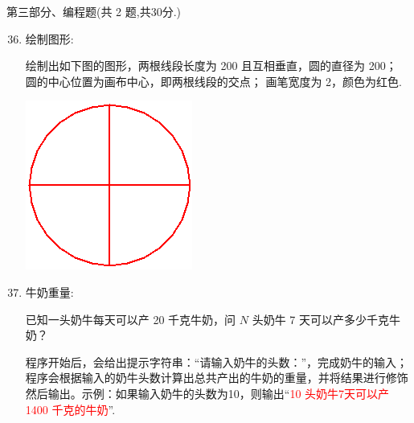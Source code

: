 \documentclass[11pt]{ctexart}
\begin{document}
    \newpage
    {\noindent\heiti 第三部分、编程题(共 2 题,共30分.)}
    \begin{enumerate}
        \setcounter{enumi}{35}
        
        \item 绘制图形:
        \begin{tasks}[label = (\arabic*)]
            \task 绘制出如下图的图形，两根线段长度为 200 且互相垂直，圆的直径为 200；
            \task 圆的中心位置为画布中心，即两根线段的交点；
            \task 画笔宽度为 2，颜色为红色.
        \end{tasks}
        \begin{center}
            \includegraphics[width=.2\textwidth]{36.png}
        \end{center}
        \vfill

        \item 牛奶重量:
        
        已知一头奶牛每天可以产 20 千克牛奶，问 $N$ 头奶牛 7 天可以产多少千克牛奶？
        \begin{tasks}[label = (\arabic*)]
            \task 程序开始后，会给出提示字符串：“请输入奶牛的头数：”，完成奶牛的输入；
            \task 程序会根据输入的奶牛头数计算出总共产出的牛奶的重量，并将结果进行修饰然后输出。示例：如果输入奶牛的头数为10，则输出“\textcolor{red}{10 头奶牛7天可以产 1400 千克的牛奶}”.
        \end{tasks}
        \vfill
    \end{enumerate}
\end{document}
